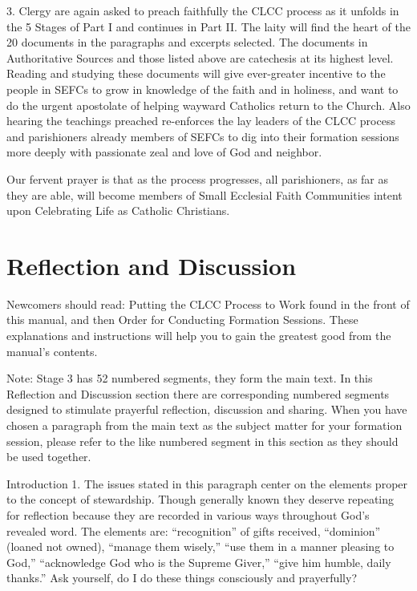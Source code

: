 \documentclass[oneside]{book}
\begin{document}
3. Clergy are again asked to preach faithfully the CLCC process as it unfolds in
the 5 Stages of Part I and continues in Part II. The laity will find the heart
of the 20 documents in the paragraphs and excerpts selected. The documents in
Authoritative Sources and those listed above are catechesis at its highest
level. Reading and studying these documents will give ever-greater incentive to
the people in SEFCs to grow in knowledge of the faith and in holiness, and want
to do the urgent apostolate of helping wayward Catholics return to the
Church. Also hearing the teachings preached re-enforces the lay leaders of the
CLCC process and parishioners already members of SEFCs to dig into their
formation sessions more deeply with passionate zeal and love of God and
neighbor.

Our fervent prayer is that as the process progresses, all parishioners, as far
as they are able, will become members of Small Ecclesial Faith Communities
intent upon Celebrating Life as Catholic Christians.


\section{Reflection and Discussion}

Newcomers should read: Putting the CLCC Process to Work found in the front of
this manual, and then Order for Conducting Formation Sessions. These
explanations and instructions will help you to gain the greatest good from the
manual's contents.

Note: Stage 3 has 52 numbered segments, they form the main text. In this
Reflection and Discussion section there are corresponding numbered segments
designed to stimulate prayerful reflection, discussion and sharing. When you
have chosen a paragraph from the main text as the subject matter for your
formation session, please refer to the like numbered segment in this section as
they should be used together.

Introduction
1. The issues stated in this paragraph center on the elements proper to the
concept of stewardship. Though generally known they deserve repeating for
reflection because they are recorded in various ways throughout God's revealed
word. The elements are: ``recognition'' of gifts received, ``dominion'' (loaned
not owned), ``manage them wisely,'' ``use them in a manner pleasing to God,''
``acknowledge God who is the Supreme Giver,'' ``give him humble, daily thanks.''
Ask yourself, do I do these things consciously and prayerfully?
\end{document}
